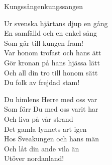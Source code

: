 \begin{song}{Kungssången}{kungssangen}
\begin{vers}
Ur svenska hjärtans djup en gång\\
En samfälld och en enkel sång\\
Som går till kungen fram!\\
Var honom trofast och hans ätt\\
Gör kronan på hans hjässa lätt\\
Och all din tro till honom sätt\\
Du folk av frejdad stam!\\
\end{vers}
\begin{vers}
Du himlens Herre med oss var\\
Som förr Du med oss varit har\\
Och liva på vår strand\\
Det gamla lynnets art igen\\
Hos Sveakungen och hans män\\
Och låt din ande vila än\\
Utöver nordanland!\\
\end{vers}
\end{song}
